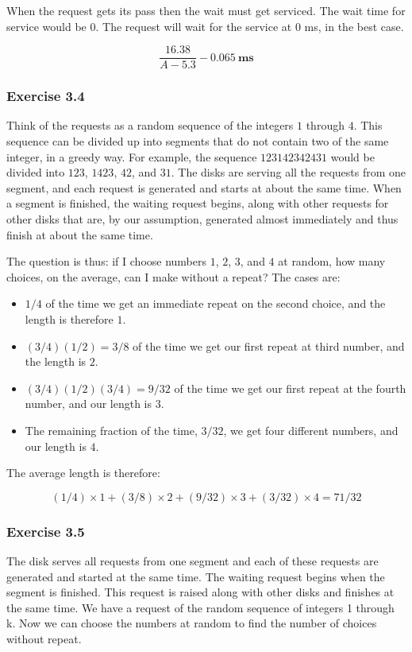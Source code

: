 \documentclass[../../main.tex]{subfiles}
\begin{document}
When the request gets its pass then the wait must get serviced. The wait
time for service would be 0. The request will wait for the service
at 0 ms, in the best case.

$$
\frac{16.38}{A - 5.3} - 0.065 \ \mathbf{ms}
$$

\subsubsection*{Exercise 3.4}

Think of the requests as a random sequence of the integers $1$ through $4$.
This sequence can be divided up into segments that do not contain two of
the same integer, in a greedy way. For example, the sequence $123142342431$
would be divided into $123$, $1423$, $42$, and $31$. The disks are serving all
the requests from one segment, and each request is generated and starts at
about the same time. When a segment is finished, the waiting request begins,
along with other requests for other disks that are, by our assumption,
generated almost immediately and thus finish at about the same time.

The question is thus: if I choose numbers $1$, $2$, $3$, and $4$ at random, how many choices, on the average,
can I make without a repeat? The cases are:

\begin{itemize}
  \item $1 / 4$ of the time we get an immediate repeat on the second choice, and the length is therefore $1$.
  \item $(3/4)(1/2)=3/8$ of the time we get our first repeat at third number, and the length is $2$.
  \item $(3/4)(1/2)(3/4)=9/32$ of the time we get our first repeat at the fourth number, and our length is $3$.
  \item The remaining fraction of the time, $3/32$, we get four different numbers, and our length is $4$.
\end{itemize}

The average length is therefore:

$$
(1 / 4) \times 1 + (3 / 8) \times 2 + (9 / 32) \times 3 + (3 / 32) \times 4= 71 / 32
$$

\subsubsection*{Exercise 3.5}

The disk serves all requests from one segment and each
of these requests are generated and started at the same time.
The waiting request begins when the segment is finished. This
request is raised along with other disks and finishes at the
same time. We have a request of the random sequence of integers
1 through k. Now we can choose the numbers at random to find
the number of choices without repeat.
\end{document}
